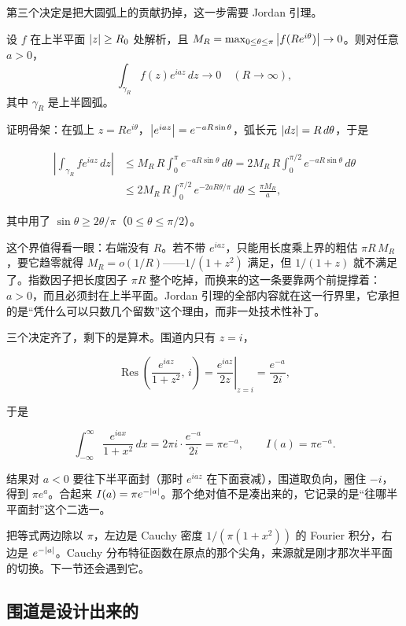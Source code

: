 第三个决定是把大圆弧上的贡献扔掉，这一步需要 Jordan 引理。

\begin{lemma}
设 \(f\) 在上半平面 \(\left|z\right|\ge R_0\) 处解析，且 \(M_R=\max_{0\le\theta\le\pi}\left|f(Re^{i\theta})\right|\to0\)。则对任意 \(a>0\)，
\[
\int_{\gamma_R}f(z)e^{iaz}\,dz\longrightarrow 0\quad(R\to\infty),
\]
其中 \(\gamma_R\) 是上半圆弧。
\end{lemma}

证明骨架：在弧上 \(z=Re^{i\theta}\)，\(\left|e^{iaz}\right|=e^{-aR\sin\theta}\)，弧长元 \(\left|dz\right|=R\,d\theta\)，于是

\[
\begin{aligned}
\left|\int_{\gamma_R}f e^{iaz}\,dz\right|
&\le M_R\,R\int_0^{\pi}e^{-aR\sin\theta}\,d\theta
=2M_R\,R\int_0^{\pi/2}e^{-aR\sin\theta}\,d\theta\\
&\le 2M_R\,R\int_0^{\pi/2}e^{-2aR\theta/\pi}\,d\theta
\le \frac{\pi M_R}{a},
\end{aligned}
\]

其中用了 \(\sin\theta\ge 2\theta/\pi\)（\(0\le\theta\le\pi/2\)）。

这个界值得看一眼：右端没有 \(R\)。若不带 \(e^{iaz}\)，只能用长度乘上界的粗估 \(\pi R\,M_R\)，要它趋零就得 \(M_R=o(1/R)\)——\(1/(1+z^2)\) 满足，但 \(1/(1+z)\) 就不满足了。指数因子把长度因子 \(\pi R\) 整个吃掉，而换来的这一条要靠两个前提撑着：\(a>0\)，而且必须封在上半平面。Jordan 引理的全部内容就在这一行界里，它承担的是``凭什么可以只数几个留数''这个理由，而非一处技术性补丁。

三个决定齐了，剩下的是算术。围道内只有 \(z=i\)，

\[
\operatorname{Res}\!\left(\frac{e^{iaz}}{1+z^2},\,i\right)=\left.\frac{e^{iaz}}{2z}\right|_{z=i}=\frac{e^{-a}}{2i},
\]

于是

\[
\int_{-\infty}^{\infty}\frac{e^{iax}}{1+x^2}\,dx=2\pi i\cdot\frac{e^{-a}}{2i}=\pi e^{-a},
\qquad I(a)=\pi e^{-a}.
\]

结果对 \(a<0\) 要往下半平面封（那时 \(e^{iaz}\) 在下面衰减），围道取负向，圈住 \(-i\)，得到 \(\pi e^{a}\)。合起来 \(I(a)=\pi e^{-\left|a\right|}\)。那个绝对值不是凑出来的，它记录的是``往哪半平面封''这个二选一。

把等式两边除以 \(\pi\)，左边是 Cauchy 密度 \(1/(\pi(1+x^2))\) 的 Fourier 积分，右边是 \(e^{-\left|a\right|}\)。Cauchy 分布特征函数在原点的那个尖角，来源就是刚才那次半平面的切换。下一节还会遇到它。

\subsection{围道是设计出来的}

